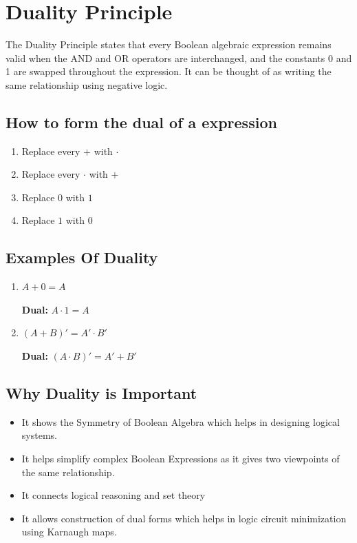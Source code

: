 \section{Duality Principle}

The Duality Principle states that every Boolean algebraic expression remains valid when the AND and OR operators are interchanged, and the constants 0 and 1 are swapped throughout the expression. It can be thought of as writing the same relationship using negative logic.

\subsection{How to form the dual of a expression}

\begin{enumerate}
    \item Replace every $+$ with $\cdot$ 
    \item Replace every $\cdot$ with $+$
    \item Replace $0$ with $1$
    \item Replace $1$ with $0$

\end{enumerate}

\subsection{Examples Of Duality}

\begin{enumerate}
    \item $A + 0 = A$ 
    
    \textbf{Dual:}  $A \cdot 1 = A$

    \item $(A + B)' = A' \cdot B'$
    
    \textbf{Dual:} $(A \cdot B)' = A' + B'$
    
\end{enumerate}

\subsection{Why Duality is Important}

\begin{itemize}
    \item It shows the Symmetry of Boolean Algebra which helps in designing logical systems.
    
    \item It helps simplify complex Boolean Expressions as it gives two viewpoints of the same relationship.
    
    \item It connects logical reasoning and set theory
    
    \item It allows construction of dual forms which helps in logic circuit minimization using Karnaugh maps.
\end{itemize}




